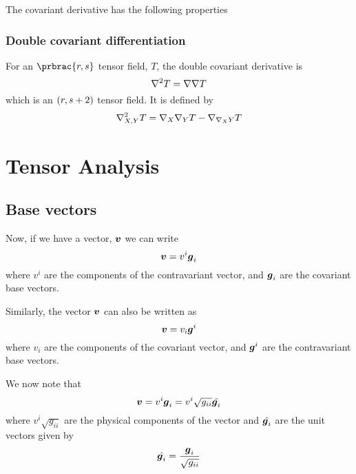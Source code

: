 The covariant derivative has the following properties

\subsubsection{Double covariant differentiation}

For an $\prbrac{r,s}$ tensor field, $T$, the double covariant derivative is
\begin{equation}
  \doublecovarderivop{}{T}=\covarderivop{}{\covarderivop{}{T}}
\end{equation}
which is an $\left( r,s+2 \right)$ tensor field. It is defined by
\begin{equation}
  \doublecovarderivop{X,Y}{T}=\covarderivop{X}{\covarderivop{Y}{T}}-\covarderivop{\connection{X}{Y}}{T}
\end{equation}

\section{Tensor Analysis}
\subsection{Base vectors}

Now, if we have a vector, $\boldsymbol{v}$ we can write
\begin{equation}
  \boldsymbol{v}=v^{i}\boldsymbol{g}_{i}
\end{equation}
where $v^{i}$ are the components of the contravariant vector, and
$\boldsymbol{g}_{i}$ are the covariant base vectors.

Similarly, the vector $\boldsymbol{v}$ can also be written as 
\begin{equation}
  \boldsymbol{v}=v_{i}\boldsymbol{g}^{i}
\end{equation}
where $v_{i}$ are the components of the covariant vector, and
$\boldsymbol{g}^{i}$ are the contravariant base vectors. 

We now note that
\begin{equation}
  \boldsymbol{v}=v^{i}\boldsymbol{g}_{i}=v^{i}\sqrt{g_{ii}}\hat{\boldsymbol{g}_{i}}
\end{equation}
where $v^{i}\sqrt{g_{ii}}$ are the physical components of the vector and
$\hat{\boldsymbol{g}_{i}}$ are the unit vectors given by
\begin{equation}
  \hat{\boldsymbol{g}_{i}}=\dfrac{\boldsymbol{g}_{i}}{\sqrt{g_{ii}}}
\end{equation}

